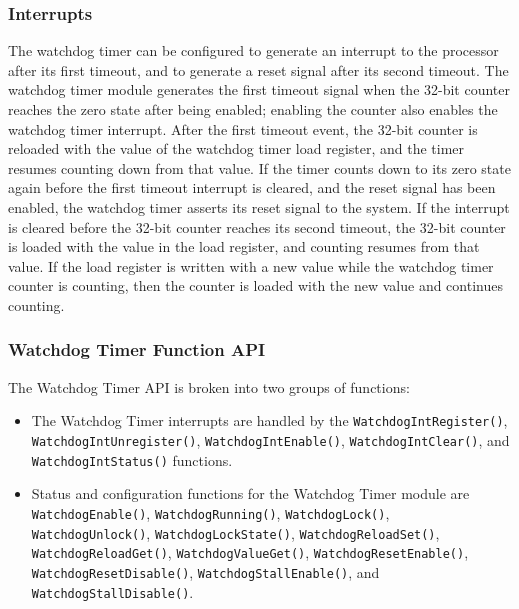 \documentclass{article}
\begin{document}
\subsubsection{Interrupts}
The watchdog timer can be configured to generate an interrupt to the
processor after its first timeout, and to generate a reset signal after
its second timeout. The watchdog timer module generates the first
timeout signal when the 32-bit counter reaches the zero state after
being enabled; enabling the counter also enables the watchdog timer
interrupt. After the first timeout event, the 32-bit counter is
reloaded with the value of the watchdog timer load register, and the
timer resumes counting down from that value. If the timer counts down
to its zero state again before the first timeout interrupt is cleared,
and the reset signal has been enabled, the watchdog timer asserts its
reset signal to the system. If the interrupt is cleared before the
32-bit counter reaches its second timeout, the 32-bit counter is loaded
with the value in the load register, and counting resumes from that
value. If the load register is written with a new value while the
watchdog timer counter is counting, then the counter is loaded with the
new value and continues counting.
\subsubsection{Watchdog Timer Function API}
The Watchdog Timer API is broken into two groups of functions:
\begin{itemize}
    \item The Watchdog Timer interrupts are handled by the
          \texttt{WatchdogIntRegister()},
          \texttt{WatchdogIntUnregister()},
          \texttt{WatchdogIntEnable()},
          \texttt{WatchdogIntClear()}, and
          \texttt{WatchdogIntStatus()} functions.
    \item Status and configuration functions for the Watchdog Timer
          module are \texttt{WatchdogEnable()},
          \texttt{WatchdogRunning()},
          \texttt{WatchdogLock()},
          \texttt{WatchdogUnlock()},
          \texttt{WatchdogLockState()},
          \texttt{WatchdogReloadSet()},
          \texttt{WatchdogReloadGet()},
          \texttt{WatchdogValueGet()},
          \texttt{WatchdogResetEnable()},
          \texttt{WatchdogResetDisable()},
          \texttt{WatchdogStallEnable()}, and
          \texttt{WatchdogStallDisable()}.
\end{itemize}
\end{document}
